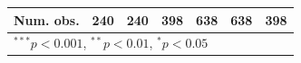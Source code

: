 \documentclass[11pt, oneside]{amsart}
\newcommand{\lib}[1]{\texttt{#1}}
\begin{document}
\begin{table}[!htp]
\begin{center}
\begin{small}
\begin{tabular}{l@{} D{.}{.}{4.6}@{} D{.}{.}{4.5}@{} D{.}{.}{5.6}@{} D{.}{.}{5.6}@{} D{.}{.}{5.4}@{} D{.}{.}{4.6}@{} }
Num. obs.                                      & 240          & 240         & 398         & 638         & 638       & 398          \\
\bottomrule
{}
\end{tabular}
\label{table:coefficients2}
\end{small}
\end{center}
\end{table}

%
%
\end{document}
